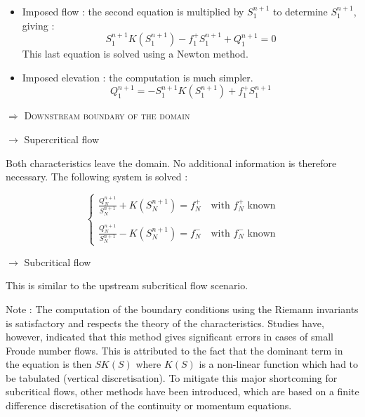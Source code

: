 \begin{itemize}
 \item Imposed flow : the second equation is multiplied by $S_{1}^{n+1}$ to determine $S_{1}^{n+1}$, giving :
   \begin{equation}
     S_{1}^{n+1} K(S_{1}^{n+1}) - f_{1}^+ S_{1}^{n+1} + Q_{1}^{n+1} = 0
   \end{equation}
   This last equation is solved using a Newton method.
 \item Imposed elevation : the computation is much simpler.
   \begin{equation}
      Q_{1}^{n+1} = -S_{1}^{n+1} K(S_{1}^{n+1}) + f_{1}^+ S_{1}^{n+1}
   \end{equation}
\end{itemize}

$\Longrightarrow$ \textsc{Downstream boundary of the domain}

$\rightarrow$ Supercritical flow

Both characteristics leave the domain. No additional information is therefore necessary. The following system is solved :

\begin{equation}
 \left \lbrace
  \begin{array}{l}
    \frac{Q_{N}^{n+1}}{S_{N}^{n+1}} + K(S_{N}^{n+1}) = f_{N}^+ \quad \mbox{with } f_{N}^+ \mbox{ known} \\
    \\
    \frac{Q_{N}^{n+1}}{S_{N}^{n+1}} - K(S_{N}^{n+1}) = f_{N}^- \quad \mbox{with } f_{N}^- \mbox{ known}
  \end{array}
 \right.
\end{equation}

$\rightarrow$ Subcritical flow

This is similar to the upstream subcritical flow scenario.

\begin{CommentBlock}{Note :}
The computation of the boundary conditions using the Riemann invariants is satisfactory and respects the theory of the characteristics. Studies have, however, indicated that this method gives significant errors in cases of small Froude number flows. This is attributed to the fact that the dominant term in the equation is then $SK(S)$ where $K(S)$ is a non-linear function which had to be tabulated (vertical discretisation). To mitigate this major shortcoming for subcritical flows, other methods have been introduced, which are based on a finite difference discretisation of the continuity or momentum equations.
\end{CommentBlock}

